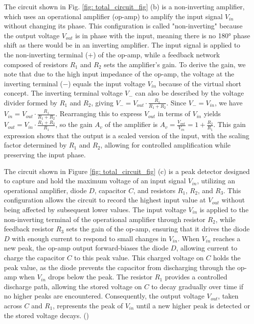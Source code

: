 \documentclass[%
 reprint,
 amsmath,amssymb,
 aps,
floatfix,
]{revtex4-2}
\begin{document}
The circuit shown in Fig. \ref{fig: total_circuit_fig} (b) is a non-inverting amplifier, which uses an operational amplifier (op-amp) to amplify the input signal \( V_{in} \) without changing its phase.
This configuration is called "non-inverting" because the output voltage \( V_{out} \) is in phase with the input, meaning there is no 180° phase shift as there would be in an inverting amplifier.
The input signal is applied to the non-inverting terminal (\(+\)) of the op-amp, while a feedback network composed of resistors \( R_1 \) and \( R_2 \) sets the amplifier's gain.
To derive the gain, we note that due to the high input impedance of the op-amp, the voltage at the inverting terminal (\(-\)) equals the input voltage \( V_{in} \) because of the virtual short concept.
The inverting terminal voltage \( V_{-} \) can also be described by the voltage divider formed by \( R_1 \) and \( R_2 \), giving \( V_{-} = V_{out} \cdot \frac{R_1}{R_1 + R_2} \).
Since \( V_{-} = V_{in} \), we have \( V_{in} = V_{out} \cdot \frac{R_1}{R_1 + R_2} \).
Rearranging this to express \( V_{out} \) in terms of \( V_{in} \) yields \( V_{out} = V_{in} \cdot \frac{R_1 + R_2}{R_1} \), so the gain \( A_v \) of the amplifier is \( A_v = \frac{V_{out}}{V_{in}} = 1 + \frac{R_2}{R_1} \).
This gain expression shows that the output is a scaled version of the input, with the scaling factor determined by \( R_1 \) and \( R_2 \), allowing for controlled amplification while preserving the input phase.


The circuit shown in Figure \ref{fig: total_circuit_fig} (c) is a peak detector designed to capture and hold the maximum voltage of an input signal \( V_{in} \), utilizing an operational amplifier, diode \( D \), capacitor \( C \), and resistors \( R_1 \), \( R_2 \), and \( R_3 \).
This configuration allows the circuit to record the highest input value at \( V_{out} \) without being affected by subsequent lower values.
The input voltage \( V_{in} \) is applied to the non-inverting terminal of the operational amplifier through resistor \( R_2 \), while feedback resistor \( R_3 \) sets the gain of the op-amp, ensuring that it drives the diode \( D \) with enough current to respond to small changes in \( V_{in} \).
When \( V_{in} \) reaches a new peak, the op-amp output forward-biases the diode \( D \), allowing current to charge the capacitor \( C \) to this peak value.
This charged voltage on \( C \) holds the peak value, as the diode prevents the capacitor from discharging through the op-amp when \( V_{in} \) drops below the peak.
The resistor \( R_1 \) provides a controlled discharge path, allowing the stored voltage on \( C \) to decay gradually over time if no higher peaks are encountered.
Consequently, the output voltage \( V_{out} \), taken across \( C \) and \( R_1 \), represents the peak of \( V_{in} \) until a new higher peak is detected or the stored voltage decays. (\cite{sedra_smith})
\end{document}
